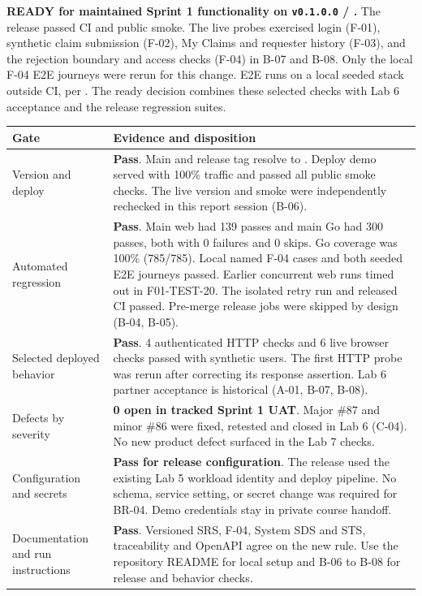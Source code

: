 \label{ev:ready}
\textbf{READY for maintained Sprint 1 functionality on \texttt{v0.1.0.0} / \revision{}.}
The release passed CI and public smoke. The live probes exercised login (F-01), synthetic claim submission (F-02), My Claims and requester history (F-03), and the rejection boundary and access checks (F-04) in B-07 and B-08. Only the local F-04 E2E journeys were rerun for this change. E2E runs on a local seeded stack outside CI, per . The ready decision combines these selected checks with Lab 6 acceptance and the release regression suites.

\begin{longtable}{@{}R{4cm}R{12.1cm}@{}}
\toprule
\textbf{Gate} & \textbf{Evidence and disposition} \\ \midrule \endhead
Version and deploy & \textbf{Pass}. Main and release tag resolve to \releaseSHA{}. Deploy demo  served \revision{} with 100\% traffic and passed all public smoke checks. The live version and smoke were independently rechecked in this report session (B-06). \\
Automated regression & \textbf{Pass}. Main web had 139 passes and main Go had 300 passes, both with 0 failures and 0 skips. Go coverage was 100\% (785/785). Local named F-04 cases and both seeded E2E journeys passed. Earlier concurrent web runs timed out in F01-TEST-20. The isolated retry run and released CI passed. Pre-merge release jobs were skipped by design (B-04, B-05). \\
Selected deployed behavior & \textbf{Pass}. 4 authenticated HTTP checks and 6 live browser checks passed with synthetic users. The first HTTP probe was rerun after correcting its response assertion. Lab 6 partner acceptance is historical (A-01, B-07, B-08). \\
Defects by severity & \textbf{0 open in tracked Sprint 1 UAT}. Major \#87 and minor \#86 were fixed, retested and closed in Lab 6 (C-04). No new product defect surfaced in the Lab 7 checks. \\
Configuration and secrets & \textbf{Pass for release configuration}. The release used the existing Lab 5 workload identity and deploy pipeline. No schema, service setting, or secret change was required for BR-04. Demo credentials stay in private course handoff. \\
Documentation and run instructions & \textbf{Pass}. Versioned SRS, F-04, System SDS and STS, traceability and OpenAPI agree on the new rule. Use the repository README for local setup and B-06 to B-08 for release and behavior checks. \\
\bottomrule
\end{longtable}

